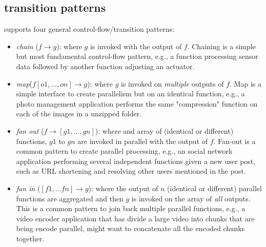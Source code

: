 

\subsection{ transition patterns}
\label{sec:transition-patterns}

%
%

\name{} supports four general  control-flow/transition patterns: 
\begin{itemize}
	\item \textit{chain} ($f\rightarrow g$): where $g$ is invoked with the output of $f$. Chaining is a simple but most fundamental control-flow pattern, e.g.,  a function processing sensor data followed by another function adjusting an
	actuator. 
	\item \textit{map}($f[o1, ..., on]\rightarrow g$): where $g$ is invoked on  \textit{multiple} outputs of $f$. Map is a simple interface to create parallelism but on an identical function, e.g.,  a photo management application performs the same "compression" function on
		each of the images in a unzipped folder. 
	\item \textit{fan out} ($f\rightarrow [g1, ..., gn]$): where and array of (identical or different) functions, $g1$ to $gn$ are invoked in parallel with the output of $f$. Fan-out is a common pattern to create parallel processing,  e.g.,  an social network application performing
	several independent functions given a new user post, such as URL shortening
	and resolving other users mentioned in the post. 
	\item \textit{fan in} ($[f1, ...fn] \rightarrow g$): where the output of $n$ (identical or different) parallel functions are aggregated and then $g$ is invoked on the array of \textit{all} outputs. This is a common pattern to join back multiple parallel functions, e.g., a video encoder application that has divide a large video
	into chunks that are being encode parallel, might want to concatenate all the encoded
	chunks together. 
\end{itemize}

